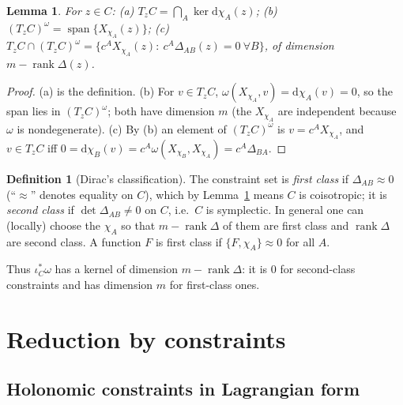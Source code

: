 \documentclass[11pt,a4paper]{article}
\numberwithin{equation}{section}
\theoremstyle{plain}
\newtheorem{lemma}[theorem]{Lemma}
\theoremstyle{definition}
\newtheorem{definition}[theorem]{Definition}
\theoremstyle{remark}
\newcommand{\rank}{\operatorname{rank}}
\newcommand{\pb}[2]{\{#1,#2\}}
\newcommand{\weq}{\mathrel{\approx}}
\newcommand{\dd}{\mathrm{d}}
\begin{document}
\begin{lemma}\label{lem:Cperp}
For $z\in C$: (a) $T_zC=\bigcap_A\ker\dd\chi_A(z)$; (b) $(T_zC)^\omega=\operatorname{span}\{X_{\chi_A}(z)\}$; (c) $T_zC\cap(T_zC)^\omega=\{c^AX_{\chi_A}(z):\ c^A\Delta_{AB}(z)=0\ \forall B\}$, of dimension $m-\rank\Delta(z)$.
\end{lemma}
\begin{proof}
(a) is the definition. (b) For $v\in T_zC$, $\omega(X_{\chi_A},v)=\dd\chi_A(v)=0$, so the span lies in $(T_zC)^\omega$; both have dimension $m$ (the $X_{\chi_A}$ are independent because $\omega$ is nondegenerate). (c) By (b) an element of $(T_zC)^\omega$ is $v=c^AX_{\chi_A}$, and $v\in T_zC$ iff $0=\dd\chi_B(v)=c^A\omega(X_{\chi_B},X_{\chi_A})=c^A\Delta_{BA}$.
\end{proof}

\begin{definition}[Dirac's classification]\label{def:class}
The constraint set is \emph{first class} if $\Delta_{AB}\weq0$ (``$\weq$'' denotes equality on $C$), which by Lemma~\ref{lem:Cperp} means $C$ is coisotropic; it is \emph{second class} if $\det\Delta_{AB}\ne0$ on $C$, i.e.\ $C$ is symplectic. In general one can (locally) choose the $\chi_A$ so that $m-\rank\Delta$ of them are first class and $\rank\Delta$ are second class. A function $F$ is first class if $\pb F{\chi_A}\weq0$ for all $A$.
\end{definition}

Thus $\iota_C^*\omega$ has a kernel of dimension $m-\rank\Delta$: it is $0$ for second-class constraints and has dimension $m$ for first-class ones.

\section{Reduction by constraints}\label{sec:constraints}

\subsection{Holonomic constraints in Lagrangian form}\label{sec:hololag}
\end{document}
